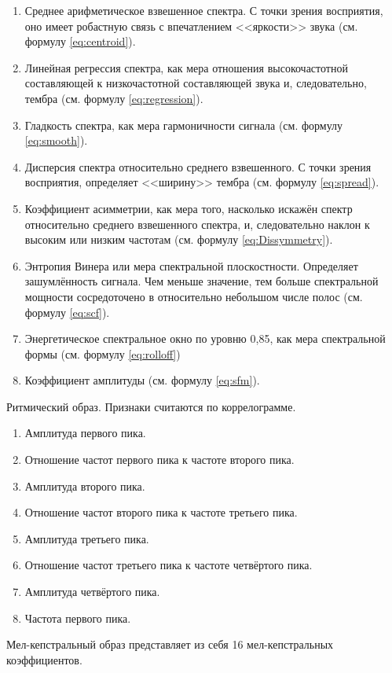 \begin{enumerate}[label=\arabic*.]
\item Среднее арифметическое взвешенное спектра. С точки зрения восприятия, оно имеет робастную связь с впечатлением <<яркости>> звука (см. формулу \ref{eq:centroid}).
\item Линейная регрессия спектра, как мера отношения высокочастотной составляющей к низкочастотной составляющей звука и, следовательно, тембра (см. формулу \ref{eq:regression}).
\item Гладкость спектра, как мера гармоничности сигнала (см. формулу \ref{eq:smooth}).
\item Дисперсия спектра относительно среднего взвешенного. С точки зрения восприятия, определяет <<ширину>> тембра (см. формулу \ref{eq:spread}).
\item Коэффициент асимметрии, как мера того, насколько искажён спектр относительно среднего взвешенного спектра, и, следовательно наклон к высоким или низким частотам (см. формулу \ref{eq:Dissymmetry}).
\item Энтропия Винера или мера спектральной плоскостности. Определяет зашумлённость сигнала. Чем меньше значение, тем больше спектральной мощности сосредоточено в относительно небольшом числе полос (см. формулу \ref{eq:scf}).
\item Энергетическое спектральное окно по уровню 0,85, как мера спектральной формы (см. формулу \ref{eq:rolloff})
\item Коэффициент амплитуды (см. формулу \ref{eq:sfm}). 
\end{enumerate}

Ритмический образ.
Признаки считаются по коррелограмме.
\begin{enumerate}[label=\arabic*.]
\item Амплитуда первого пика.
\item Отношение частот первого пика к частоте второго пика.
\item Амплитуда второго пика.
\item Отношение частот второго пика к частоте третьего пика.
\item Амплитуда третьего пика.
\item Отношение частот третьего пика к частоте четвёртого пика.
\item Амплитуда четвёртого пика.
\item Частота первого пика.
\end{enumerate}

Мел-кепстральный образ представляет из себя 16 мел-кепстральных коэффициентов.
